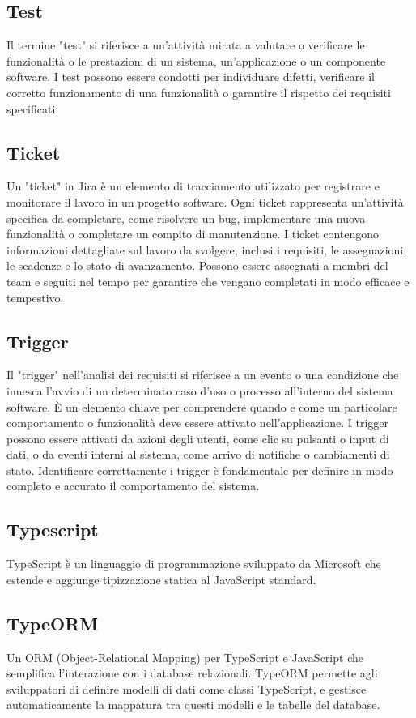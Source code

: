 \subsection*{Test} 
Il termine "test" si riferisce a un'attività mirata a valutare o verificare le funzionalità o le prestazioni di un sistema, un'applicazione o un componente software. I test possono essere condotti per individuare difetti, verificare il corretto funzionamento di una funzionalità o garantire il rispetto dei requisiti specificati. 
\subsection*{Ticket} 
Un "ticket" in Jira è un elemento di tracciamento utilizzato per registrare e monitorare il lavoro in un progetto software. Ogni ticket rappresenta un'attività specifica da completare, come risolvere un bug, implementare una nuova funzionalità o completare un compito di manutenzione. I ticket contengono informazioni dettagliate sul lavoro da svolgere, inclusi i requisiti, le assegnazioni, le scadenze e lo stato di avanzamento. Possono essere assegnati a membri del team e seguiti nel tempo per garantire che vengano completati in modo efficace e tempestivo. 
\subsection*{Trigger} 
Il "trigger" nell'analisi dei requisiti si riferisce a un evento o una condizione che innesca l'avvio di un determinato caso d'uso o processo all'interno del sistema software. È un elemento chiave per comprendere quando e come un particolare comportamento o funzionalità deve essere attivato nell'applicazione. I trigger possono essere attivati da azioni degli utenti, come clic su pulsanti o input di dati, o da eventi interni al sistema, come arrivo di notifiche o cambiamenti di stato. Identificare correttamente i trigger è fondamentale per definire in modo completo e accurato il comportamento del sistema. 
\subsection*{Typescript} 
TypeScript è un linguaggio di programmazione sviluppato da Microsoft che estende e aggiunge tipizzazione statica al JavaScript standard.
\subsection*{TypeORM} 
Un ORM (Object-Relational Mapping) per TypeScript e JavaScript che semplifica l'interazione con i database relazionali. TypeORM permette agli sviluppatori di definire modelli di dati come classi TypeScript, e gestisce automaticamente la mappatura tra questi modelli e le tabelle del database.
